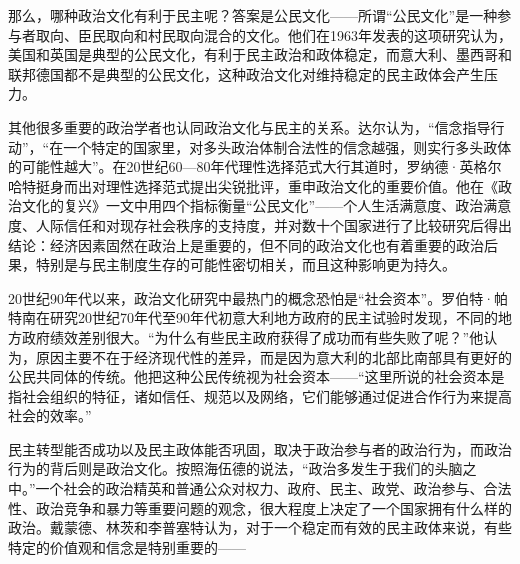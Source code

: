 
那么，哪种政治文化有利于民主呢？答案是公民文化——所谓“公民文化”是一种参与者取向、臣民取向和村民取向混合的文化。他们在1963年发表的这项研究认为，美国和英国是典型的公民文化，有利于民主政治和政体稳定，而意大利、墨西哥和联邦德国都不是典型的公民文化，这种政治文化对维持稳定的民主政体会产生压力。

其他很多重要的政治学者也认同政治文化与民主的关系。达尔认为，“信念指导行动”，“在一个特定的国家里，对多头政治体制合法性的信念越强，则实行多头政体的可能性越大”。在20世纪60—80年代理性选择范式大行其道时，罗纳德·英格尔哈特挺身而出对理性选择范式提出尖锐批评，重申政治文化的重要价值。他在《政治文化的复兴》一文中用四个指标衡量“公民文化”——个人生活满意度、政治满意度、人际信任和对现存社会秩序的支持度，并对数十个国家进行了比较研究后得出结论：经济因素固然在政治上是重要的，但不同的政治文化也有着重要的政治后果，特别是与民主制度生存的可能性密切相关，而且这种影响更为持久。

20世纪90年代以来，政治文化研究中最热门的概念恐怕是“社会资本”。罗伯特·帕特南在研究20世纪70年代至90年代初意大利地方政府的民主试验时发现，不同的地方政府绩效差别很大。“为什么有些民主政府获得了成功而有些失败了呢？”他认为，原因主要不在于经济现代性的差异，而是因为意大利的北部比南部具有更好的公民共同体的传统。他把这种公民传统视为社会资本——“这里所说的社会资本是指社会组织的特征，诸如信任、规范以及网络，它们能够通过促进合作行为来提高社会的效率。”

民主转型能否成功以及民主政体能否巩固，取决于政治参与者的政治行为，而政治行为的背后则是政治文化。按照海伍德的说法，“政治多发生于我们的头脑之中。”一个社会的政治精英和普通公众对权力、政府、民主、政党、政治参与、合法性、政治竞争和暴力等重要问题的观念，很大程度上决定了一个国家拥有什么样的政治。戴蒙德、林茨和李普塞特认为，对于一个稳定而有效的民主政体来说，有些特定的价值观和信念是特别重要的——


